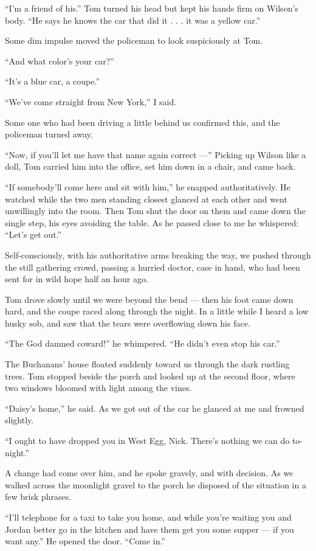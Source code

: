 \documentclass{znotebook}
\begin{document}
``I'm a friend of his.'' Tom turned his head but kept his hands firm on Wilson's body. ``He says he knows the car that did it . . . it was a yellow car.''

Some dim impulse moved the policeman to look suspiciously at Tom.

``And what color's your car?''

``It's a blue car, a coupe.''

``We've come straight from New York,'' I said.

Some one who had been driving a little behind us confirmed this, and the policeman turned away.

``Now, if you'll let me have that name again correct ---'' Picking up Wilson like a doll, Tom carried him into the office, set him down in a chair, and came back.

``If somebody'll come here and sit with him,'' he snapped authoritatively. He watched while the two men standing closest glanced at each other and went unwillingly into the room. Then Tom shut the door on them and came down the single step, his eyes avoiding the table. As he passed close to me he whispered: ``Let's get out.''

Self-consciously, with his authoritative arms breaking the way, we pushed through the still gathering crowd, passing a hurried doctor, case in hand, who had been sent for in wild hope half an hour ago.

Tom drove slowly until we were beyond the bend ---{} then his foot came down hard, and the coupe raced along through the night. In a little while I heard a low husky sob, and saw that the tears were overflowing down his face.

``The God damned coward!'' he whimpered. ``He didn't even stop his car.''

The Buchanans' house floated suddenly toward us through the dark rustling trees. Tom stopped beside the porch and looked up at the second floor, where two windows bloomed with light among the vines.

``Daisy's home,'' he said. As we got out of the car he glanced at me and frowned slightly.

``I ought to have dropped you in West Egg, Nick. There's nothing we can do to-night.''

A change had come over him, and he spoke gravely, and with decision. As we walked across the moonlight gravel to the porch he disposed of the situation in a few brisk phrases.

``I'll telephone for a taxi to take you home, and while you're waiting you and Jordan better go in the kitchen and have them get you some supper ---{} if you want any.'' He opened the door. ``Come in.''
\end{document}
